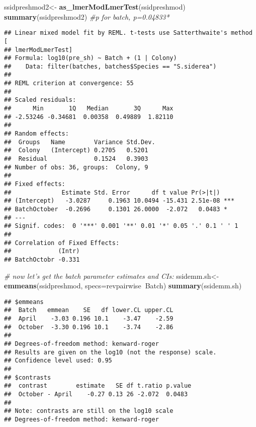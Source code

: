 \documentclass[]{article}
\newenvironment{Shaded}{\begin{snugshade}}{\end{snugshade}}
\newcommand{\CommentTok}[1]{\textcolor[rgb]{0.56,0.35,0.01}{\textit{#1}}}
\newcommand{\DataTypeTok}[1]{\textcolor[rgb]{0.13,0.29,0.53}{#1}}
\newcommand{\KeywordTok}[1]{\textcolor[rgb]{0.13,0.29,0.53}{\textbf{#1}}}
\newcommand{\NormalTok}[1]{#1}
\newcommand{\OperatorTok}[1]{\textcolor[rgb]{0.81,0.36,0.00}{\textbf{#1}}}
\newcommand{\StringTok}[1]{\textcolor[rgb]{0.31,0.60,0.02}{#1}}
\begin{document}
\begin{Shaded}
\begin{Highlighting}[]
\NormalTok{ssidpreshmod2<-}\StringTok{ }\KeywordTok{as_lmerModLmerTest}\NormalTok{(ssidpreshmod)}
\KeywordTok{summary}\NormalTok{(ssidpreshmod2) }\CommentTok{#p for batch, p=0.04833*}
\end{Highlighting}
\end{Shaded}

\begin{verbatim}
## Linear mixed model fit by REML. t-tests use Satterthwaite's method [
## lmerModLmerTest]
## Formula: log10(pre_sh) ~ Batch + (1 | Colony)
##    Data: filter(batches, batches$Species == "S.siderea")
## 
## REML criterion at convergence: 55
## 
## Scaled residuals: 
##      Min       1Q   Median       3Q      Max 
## -2.53246 -0.34681  0.00358  0.49889  1.82110 
## 
## Random effects:
##  Groups   Name        Variance Std.Dev.
##  Colony   (Intercept) 0.2705   0.5201  
##  Residual             0.1524   0.3903  
## Number of obs: 36, groups:  Colony, 9
## 
## Fixed effects:
##              Estimate Std. Error      df t value Pr(>|t|)    
## (Intercept)   -3.0287     0.1963 10.0494 -15.431 2.51e-08 ***
## BatchOctober  -0.2696     0.1301 26.0000  -2.072   0.0483 *  
## ---
## Signif. codes:  0 '***' 0.001 '**' 0.01 '*' 0.05 '.' 0.1 ' ' 1
## 
## Correlation of Fixed Effects:
##             (Intr)
## BatchOctobr -0.331
\end{verbatim}

\begin{Shaded}
\begin{Highlighting}[]
\CommentTok{# now let's get the batch parameter estimates and CIs:}
\NormalTok{ssidemm.sh<-}\StringTok{ }\KeywordTok{emmeans}\NormalTok{(ssidpreshmod, }\DataTypeTok{specs=}\NormalTok{revpairwise}\OperatorTok{~}\NormalTok{Batch) }
\KeywordTok{summary}\NormalTok{(ssidemm.sh)}
\end{Highlighting}
\end{Shaded}

\begin{verbatim}
## $emmeans
##  Batch   emmean    SE   df lower.CL upper.CL
##  April    -3.03 0.196 10.1    -3.47    -2.59
##  October  -3.30 0.196 10.1    -3.74    -2.86
## 
## Degrees-of-freedom method: kenward-roger 
## Results are given on the log10 (not the response) scale. 
## Confidence level used: 0.95 
## 
## $contrasts
##  contrast        estimate   SE df t.ratio p.value
##  October - April    -0.27 0.13 26 -2.072  0.0483 
## 
## Note: contrasts are still on the log10 scale 
## Degrees-of-freedom method: kenward-roger
\end{verbatim}
\end{document}
